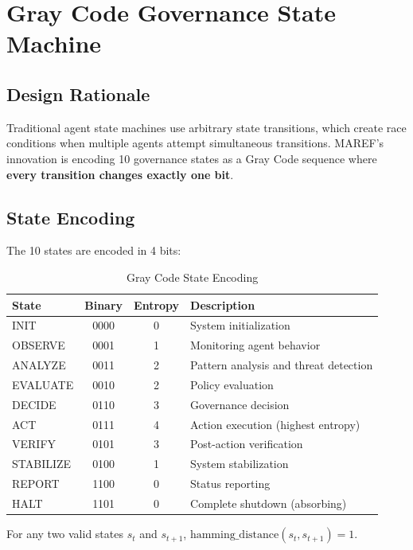 \documentclass[11pt,a4paper]{article}
\begin{document}
\section{Gray Code Governance State Machine}
\label{sec:graycode}

\subsection{Design Rationale}

Traditional agent state machines use arbitrary state transitions, which create race conditions when multiple agents attempt simultaneous transitions. MAREF's innovation is encoding 10 governance states as a Gray Code sequence where \textbf{every transition changes exactly one bit}.

\subsection{State Encoding}

The 10 states are encoded in 4 bits:

\begin{table}[ht]
\centering
\caption{Gray Code State Encoding}
\label{tab:graycode}
\begin{tabular}{lccp{4cm}}
\toprule
State & Binary & Entropy & Description \\
\midrule
INIT & 0000 & 0 & System initialization \\
OBSERVE & 0001 & 1 & Monitoring agent behavior \\
ANALYZE & 0011 & 2 & Pattern analysis and threat detection \\
EVALUATE & 0010 & 2 & Policy evaluation \\
DECIDE & 0110 & 3 & Governance decision \\
ACT & 0111 & 4 & Action execution (highest entropy) \\
VERIFY & 0101 & 3 & Post-action verification \\
STABILIZE & 0100 & 1 & System stabilization \\
REPORT & 1100 & 0 & Status reporting \\
HALT & 1101 & 0 & Complete shutdown (absorbing) \\
\bottomrule
\end{tabular}
\end{table}

\begin{theorem}
For any two valid states $s_t$ and $s_{t+1}$, $\text{hamming\_distance}(s_t, s_{t+1}) = 1$.
\end{theorem}
\end{document}
